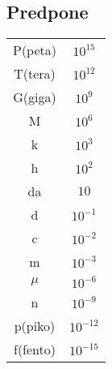 {\color{indiagreen}\subsection{Predpone}}
\begin{center}
	\begin{tabular}{|c c|} 
 	\hline
 	P(peta) & $10^15$ \\
 	T(tera) & $10^12$ \\
 	G(giga) & $10^9$ \\
 	M & $10^6$ \\
 	k & $10^3$ \\
 	h & $10^2$ \\
 	da & $10$ \\
 	d & $10^{-1}$ \\
 	c & $10^{-2}$ \\
 	m & $10^{-3}$ \\
 	$\mu$& $10^{-6}$ \\
 	n & $10^{-9}$ \\
 	p(piko) & $10^{-12}$ \\
 	f(fento) & $10^{-15}$ \\
 	\hline
 	\end{tabular}
\end{center}